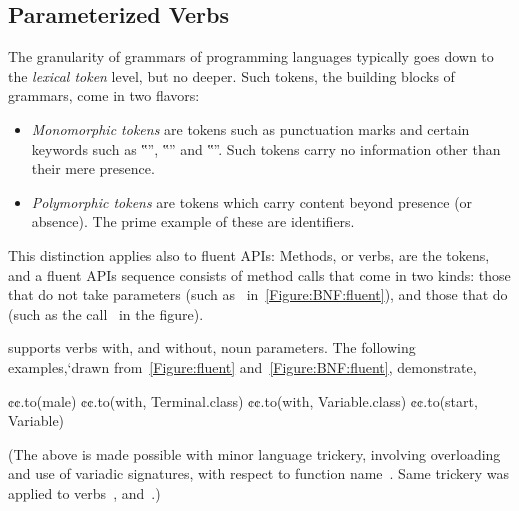 \subsection{Parameterized Verbs}
The granularity of grammars of programming languages typically goes down to the \emph{lexical token} level,
  but no deeper.
Such tokens, the building blocks of grammars, come in two flavors:
\begin{itemize}
  \item \emph{Monomorphic tokens} are tokens such as punctuation marks and
    certain keywords such as ‟”, ‟” and ‟”.
    Such tokens carry no information other than their mere presence.
  \item \emph{Polymorphic tokens} are tokens which carry content beyond
    presence (or absence). The prime example of these are identifiers.
\end{itemize}

This distinction applies also to fluent APIs:
Methods, or verbs, are the tokens, and a fluent APIs sequence consists of
method calls that come in two kinds: those that do not take parameters (such as~ in~\cref{Figure:BNF:fluent}),
and those that do (such as the call~ in the figure).

\Self supports verbs with, and without, noun parameters.
The following examples,`drawn from~\cref{Figure:fluent} and~\cref{Figure:BNF:fluent},
  demonstrate,
\begin{JAVA}
  ¢¢.to(male)
  ¢¢.to(with, Terminal.class)
  ¢¢.to(with, Variable.class)
  ¢¢.to(start, Variable)\end{JAVA}
(The above is made possible with minor \Java language trickery,
  involving overloading and use of variadic signatures,
  with respect to function name~.
Same trickery was applied to verbs~, and~.)
